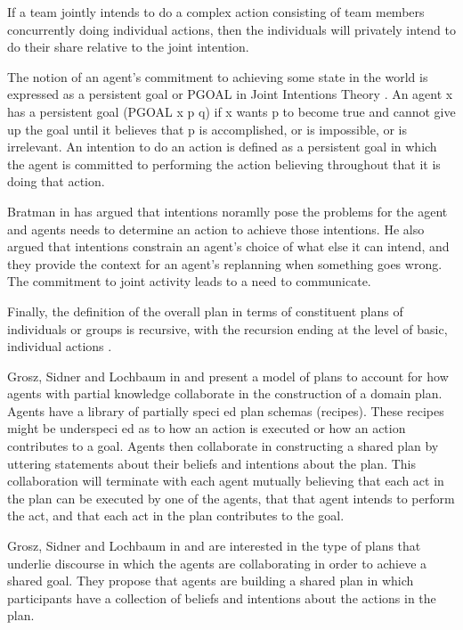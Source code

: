\documentclass[11pt]{article}
\begin{document}
If a team jointly intends to do a complex action consisting of team members
concurrently doing individual actions, then the individuals will privately
intend to do their share relative to the joint intention.

The notion of an agent’s commitment to achieving some state in the world is
expressed as a persistent goal or PGOAL in Joint Intentions Theory
\cite{cohen:intention-commitment}. An agent x has a persistent goal (PGOAL x p
q) if x wants p to become true and cannot give up the goal until it believes
that p is accomplished, or is impossible, or is irrelevant. An intention to do
an action is defined as a persistent goal in which the agent is committed to
performing the action believing throughout that it is doing that action.

Bratman in \cite{bratman:intentions-plans} has argued that intentions noramlly
pose the problems for the agent and agents needs to determine an action to
achieve those intentions. He also argued that intentions constrain an agent’s
choice of what else it can intend, and they provide the context for an agent’s
replanning when something goes wrong. The commitment to joint activity leads to
a need to communicate.

Finally, the definition of the overall plan in terms of constituent plans of
individuals or groups is recursive, with the recursion ending at the level of
basic, individual actions \cite{grosz:mice-menus}.

Grosz, Sidner and Lochbaum in \cite{grosz:plans-discourse} and
\cite{lochbaum:plan-models} present a model of plans to account for how agents
with partial knowledge collaborate in the construction of a domain plan. Agents
have a library of partially speci ed plan schemas (recipes). These recipes might
be underspeci ed as to how an action is executed or how an action contributes to
a goal. Agents then collaborate in constructing a shared plan by uttering
statements about their beliefs and intentions about the plan. This collaboration
will terminate with each agent mutually believing that each act in the plan can
be executed by one of the agents, that that agent intends to perform the act,
and that each act in the plan contributes to the goal.

Grosz, Sidner and Lochbaum in \cite{grosz:plans-discourse} and
\cite{lochbaum:plan-models} are interested in the type of plans that underlie
discourse in which the agents are collaborating in order to achieve a shared
goal. They propose that agents are building a shared plan in which participants
have a collection of beliefs and intentions about the actions in the plan.
\end{document}

